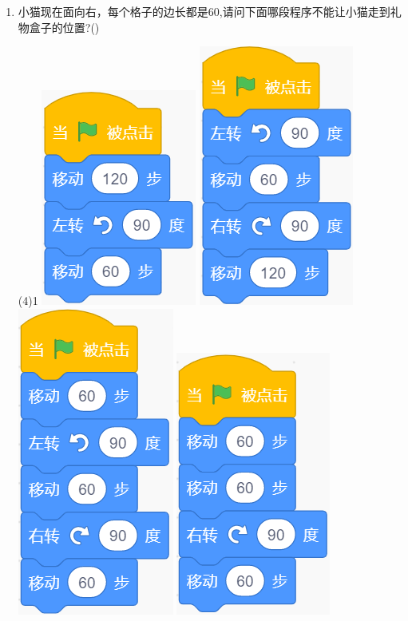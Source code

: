 \documentclass[10pt, a4paper]{article}
\begin{document}
\begin{enumerate}
        \item 小猫现在面向右，每个格子的边长都是60,请问下面哪段程序不能让小猫走到礼物盒子的位置?(\qquad)
        \begin{tasks}(4)1
            \task \includegraphics[width=.1\textwidth]{3a.png}
            \task \includegraphics[width=.1\textwidth]{3b.png}
            \task \includegraphics[width=.09\textwidth]{3c.png}
            \task \includegraphics[width=.1\textwidth]{3d.png}
        \end{tasks}


\end{enumerate}
\end{document}
